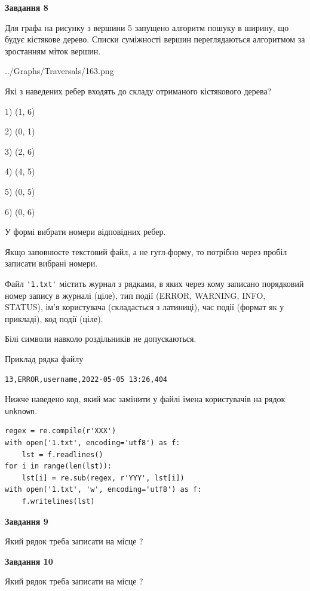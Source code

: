 \documentclass[12pt, ukrainian]{article}
\def\code#1{\Verb!#1!}
\begin{document}
{\begin {large}
{\begin {center}\textbf{Завдання 8}\end {center}}\par
Для графа на рисунку з вершини 5 запущено алгоритм пошуку в ширину, що будує кістякове дерево. Списки суміжності вершин переглядаються алгоритмом за зростанням міток вершин.\par
\begin{center}
	{../Graphs/Traversals/163.png}
\end{center}
\par Які з наведених ребер входять до складу отриманого кістякового дерева?\par
1) (1, 6)\par
2) (0, 1)\par
3) (2, 6)\par
4) (4, 5)\par
5) (0, 5)\par
6) (0, 6)\par
{\vskip 15pt} У формі вибрати номери відповідних ребер.


Якщо заповнюєте текстовий файл, а не гугл-форму, то потрібно через пробіл записа\-ти вибрані номери.\par
\newpage


Файл \code{'1.txt'} містить журнал з рядками, в яких через кому записано поряд\-ко\-вий номер запису в журналі (ціле), тип події (ERROR, WARNING, INFO, STATUS), ім'я користувача (складається з латиниці), час події (фор\-мат як у прикладі), код події (ціле).

Білі символи навколо роздільників не допускаються.

Приклад рядка файлу



\begin{verbatim}
13,ERROR,username,2022-05-05 13:26,404
\end{verbatim}


Нижче наведено код, який має замінити у файлі імена користувачів на рядок \code{unknown}.



\begin{verbatim}
regex = re.compile(r'XXX')
with open('1.txt', encoding='utf8') as f:
    lst = f.readlines()
for i in range(len(lst)):
    lst[i] = re.sub(regex, r'YYY', lst[i])
with open('1.txt', 'w', encoding='utf8') as f:
    f.writelines(lst)
\end{verbatim}




{\begin {center}\textbf{Завдання 9}\end {center}}\par
Який рядок треба записати на місце  ?\par
\vspace{5mm}


{\begin {center}\textbf{Завдання 10}\end {center}}\par
Який рядок треба записати на місце  ?\par


\newpage


\end {large}}
\end{document}
